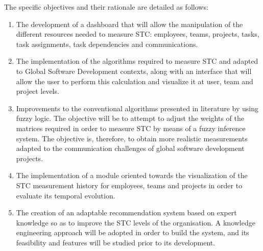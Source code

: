 The specific objectives and their rationale are detailed as follows:

\begin{enumerate}
\item The development of a dashboard that will allow the manipulation of the different resources needed to measure STC: employees, teams, projects, tasks, task assignments, task dependencies and communications.
\item The implementation of the algorithms required to measure STC and adapted to Global Software Development contexts, along with an interface that will allow the user to perform this calculation and visualize it at user, team and project levels.
\item Improvements to the conventional algorithms presented in literature by using fuzzy logic. The objective will be to attempt to adjust the weights of the matrices required in order to measure STC by means of a fuzzy inference system. The objective is, therefore, to obtain more realistic measurements adapted to the communication challenges of global software development projects.
\item The implementation of a module oriented towards the visualization of the STC measurement history for employees, teams and projects in order to evaluate its temporal evolution.
\item The creation of an adaptable recommendation system based on expert knowledge so as to improve the STC levels of the organisation. A knowledge engineering approach will be adopted in order to build the system, and its feasibility and features will be studied prior to its development.
\end{enumerate}